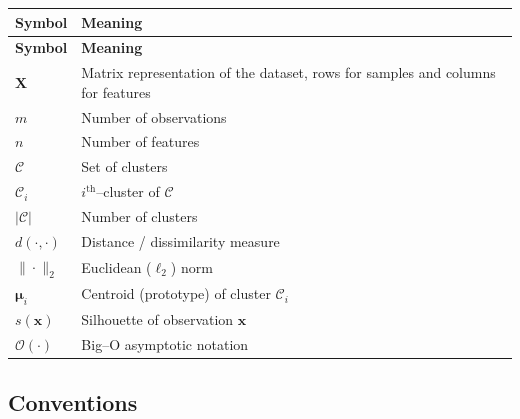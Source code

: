 \begin{longtable}{@{}l P{12cm}@{}}
  \toprule
  \textbf{Symbol} & \textbf{Meaning} \\
  \midrule
  \endfirsthead
  \toprule
  \textbf{Symbol} & \textbf{Meaning} \\
  \midrule
  \endhead
  \bottomrule
  \endlastfoot
  $\mathbf X$          & Matrix representation of the dataset, rows for samples and columns for features \\
  $m$          & Number of observations \\
  $n$          & Number of features \\
  $\mathcal C$ & Set of clusters \\
  $\mathcal C_i$ & $i^\text{th}$–cluster of $\mathcal C$ \\
  $|\mathcal C|$  & Number of clusters \\
  $d(\cdot,\cdot)$ & Distance / dissimilarity measure \\
  $\| \cdot \|_2$ & Euclidean ($\ell_2$) norm \\
  $\boldsymbol \mu_i$ & Centroid (prototype) of cluster $\mathcal C_i$ \\
  $s(\mathbf x)$ & Silhouette of observation $\mathbf x$ \\
  $\mathcal O(\cdot)$ & Big–O asymptotic notation \\
\end{longtable}
\addtocounter{table}{-1}  %

\subsection*{Conventions}

